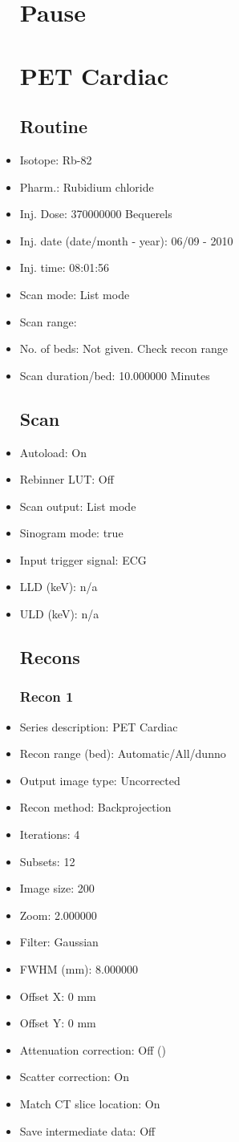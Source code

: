 \documentclass[12pt]{article}
\begin{document}
\begin{itemize}
\section{Pause}
\section{PET Cardiac}\subsection{Routine}
\item Isotope: Rb-82
\item Pharm.: Rubidium chloride
\item Inj. Dose: 370000000 Bequerels
\item Inj. date (date/month - year): 06/09 - 2010
\item Inj. time: 08:01:56
\item Scan mode: List mode
\item Scan range: 
\item No. of beds: Not given. Check recon range
\item Scan duration/bed: 10.000000 Minutes
\subsection{Scan}
\item Autoload: On
\item Rebinner LUT: Off
\item Scan output: List mode
\item Sinogram mode: true
\item Input trigger signal: ECG
\item LLD (keV): n/a
\item ULD (keV): n/a
\subsection{Recons}
\subsubsection{Recon 1}
\item Series description: PET Cardiac
\item Recon range (bed): Automatic/All/dunno
\item Output image type: Uncorrected
\item Recon method: Backprojection
\item Iterations: 4
\item Subsets: 12
\item Image size: 200
\item Zoom: 2.000000
\item Filter: Gaussian
\item FWHM (mm): 8.000000
\item Offset X: 0 mm
\item Offset Y: 0 mm
\item Attenuation correction: Off ()
\item Scatter correction: On
\item Match CT slice location: On
\item Save intermediate data: Off

\end{itemize}
\end{document}
